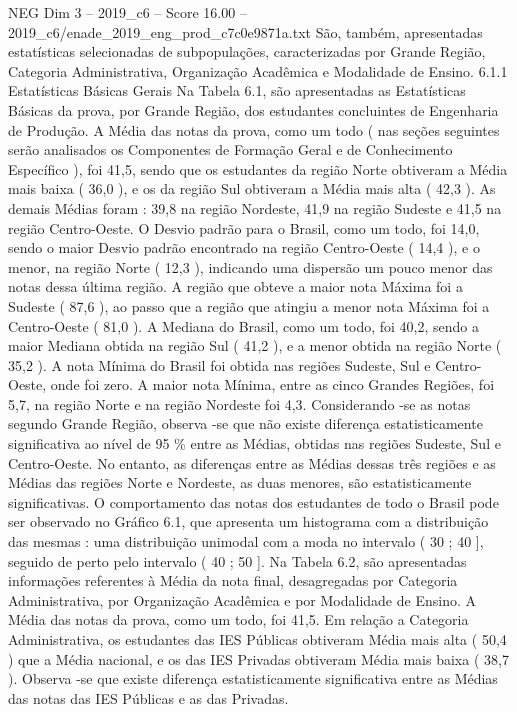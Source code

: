 \begin{textsample}{NEG Dim 3 – 2019\_c6 – Score 16.00 – 2019\_c6/enade\_2019\_eng\_prod\_c7c0e9871a.txt}
São, também, apresentadas estatísticas selecionadas de subpopulações, caracterizadas por Grande Região, Categoria Administrativa, Organização Acadêmica e Modalidade de Ensino. 6.1.1 Estatísticas Básicas Gerais Na Tabela 6.1, são apresentadas as Estatísticas Básicas da prova, por Grande Região, dos estudantes concluintes de Engenharia de Produção.
A Média das notas da prova, como um todo ( nas seções seguintes serão analisados os Componentes de Formação Geral e de Conhecimento Específico ), foi 41,5, sendo que os estudantes da região Norte obtiveram a Média mais baixa ( 36,0 ), e os da região Sul obtiveram a Média mais alta ( 42,3 ).
As demais Médias foram : 39,8 na região Nordeste, 41,9 na região Sudeste e 41,5 na região Centro-Oeste.
O Desvio padrão para o Brasil, como um todo, foi 14,0, sendo o maior Desvio padrão encontrado na região Centro-Oeste ( 14,4 ), e o menor, na região Norte ( 12,3 ), indicando uma dispersão um pouco menor das notas dessa última região.
A região que obteve a maior nota Máxima foi a Sudeste ( 87,6 ), ao passo que a região que atingiu a menor nota Máxima foi a Centro-Oeste ( 81,0 ).
A Mediana do Brasil, como um todo, foi 40,2, sendo a maior Mediana obtida na região Sul ( 41,2 ), e a menor obtida na região Norte ( 35,2 ).
A nota Mínima do Brasil foi obtida nas regiões Sudeste, Sul e Centro-Oeste, onde foi zero.
A maior nota Mínima, entre as cinco Grandes Regiões, foi 5,7, na região Norte e na região Nordeste foi 4,3.
Considerando -se as notas segundo Grande Região, observa -se que não existe diferença estatisticamente significativa ao nível de 95 \% entre as Médias, obtidas nas regiões Sudeste, Sul e Centro-Oeste.
No entanto, as diferenças entre as Médias dessas três regiões e as Médias das regiões Norte e Nordeste, as duas menores, são estatisticamente significativas.
O comportamento das notas dos estudantes de todo o Brasil pode ser observado no Gráfico 6.1, que apresenta um histograma com a distribuição das mesmas : uma distribuição unimodal com a moda no intervalo ( 30 ; 40 ], seguido de perto pelo intervalo ( 40 ; 50 ].
Na Tabela 6.2, são apresentadas informações referentes à Média da nota final, desagregadas por Categoria Administrativa, por Organização Acadêmica e por Modalidade de Ensino.
A Média das notas da prova, como um todo, foi 41,5.
Em relação a Categoria Administrativa, os estudantes das IES Públicas obtiveram Média mais alta ( 50,4 ) que a Média nacional, e os das IES Privadas obtiveram Média mais baixa ( 38,7 ).
Observa -se que existe diferença estatisticamente significativa entre as Médias das notas das IES Públicas e as das Privadas.

\end{textsample}
